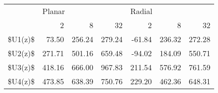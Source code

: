 \begin{tabular}{lrrrrrr}
\toprule
{} & \multicolumn{3}{l}{Planar} & \multicolumn{3}{l}{Radial} \\
{} &     2  &     8  &     32 &     2  &     8  &     32 \\
\midrule
\$U1(z)\$ &  73.50 & 256.24 & 279.24 & -61.84 & 236.32 & 272.28 \\
\$U2(z)\$ & 271.71 & 501.16 & 659.48 & -94.02 & 184.09 & 550.71 \\
\$U3(z)\$ & 418.16 & 666.00 & 967.83 & 211.54 & 576.92 & 761.59 \\
\$U4(z)\$ & 473.85 & 638.39 & 750.76 & 229.20 & 462.36 & 648.31 \\
\bottomrule
\end{tabular}
